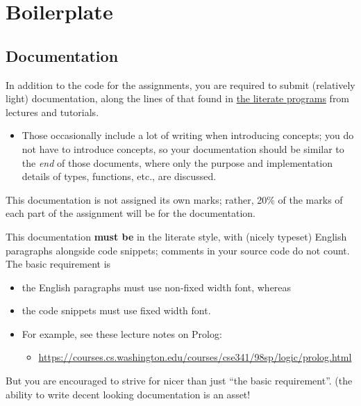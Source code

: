 \documentclass[11pt]{article}
\theoremstyle{definition}
\begin{document}
\section*{Boilerplate}
\label{sec:org6de373d}
\subsection*{Documentation}
\label{sec:org7586aa8}
In addition to the code for the assignments,
you are required to submit (relatively light) documentation,
along the lines of that found in
\href{https://armkeh.github.io/principles-of-programming-languages/\#outline-container-Lecture-literate-programs}{the literate programs}
from lectures and tutorials.
\begin{itemize}
\item Those occasionally include a lot of writing when introducing concepts;
you do not have to introduce concepts, so your documentation
should be similar to the \emph{end} of those documents,
where only the purpose and implementation details
of types, functions, etc., are discussed.
\end{itemize}

This documentation is not assigned its own marks;
rather, 20\% of the marks of each part of the assignment
will be for the documentation.

This documentation \textbf{must be} in the literate style,
with (nicely typeset) English paragraphs alongside code snippets;
comments in your source code do not count.
The basic requirement is
\begin{itemize}
\item the English paragraphs must use non-fixed width font, whereas
\item the code snippets must use fixed width font.
\item For example, see these lecture notes on Prolog:
\begin{itemize}
\item \url{https://courses.cs.washington.edu/courses/cse341/98sp/logic/prolog.html}
\end{itemize}
\end{itemize}
But you are encouraged to strive for nicer than just
“the basic requirement”.
(the ability to write decent looking documentation is an asset!
\end{document}
